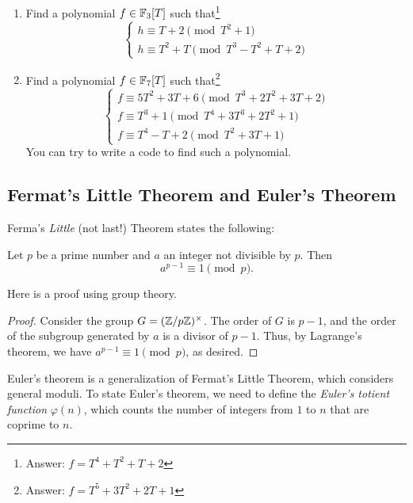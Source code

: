 \begin{exercise}
    \begin{enumerate}
        \item Find a polynomial $f \in \mathbb{F}_3[T]$ such that\footnote{Answer: $f = T^4 + T^2 + T + 2$}
        \[
        \begin{cases}
            h \equiv T + 2 \pmod{T^2 + 1} \\
            h \equiv T^2 + T \pmod{T^3 - T^2 +  T + 2}
        \end{cases} 
        \]
        \item Find a polynomial $f \in \mathbb{F}_{7}[T]$ such that\footnote{Answer: $f = T^5 + 3T^2 + 2T + 1$}
        \[
        \begin{cases}
            f \equiv 5T^2 + 3T + 6 \pmod{T^3 + 2T^2 + 3T + 2} \\
            f \equiv T^3 + 1 \pmod{T^4 + 3T^3 + 2T^2 + 1} \\
            f \equiv T^4 - T + 2 \pmod{T^2 + 3T + 1}
        \end{cases} 
        \]
        You can try to write a code to find such a polynomial.
    \end{enumerate}
\end{exercise}

\subsection{Fermat's Little Theorem and Euler's Theorem}
\label{subsec:basicnt_flittlet}

Ferma's \emph{Little} (not last!) Theorem states the following:
\begin{theorem}
    \label{thm:fermat_little}
    Let $p$ be a prime number and $a$ an integer not divisible by $p$.
    Then
    \[
        a^{p - 1} \equiv 1 \pmod{p}.
    \]
\end{theorem}

Here is a proof using group theory.

\begin{proof}
    Consider the group $G = (\mathbb{Z} / p\mathbb{Z})^\times$.
    The order of $G$ is $p - 1$, and the order of the subgroup generated by $a$ is a divisor of $p - 1$.
    Thus, by Lagrange's theorem, we have $a^{p - 1} \equiv 1 \pmod{p}$, as desired.
\end{proof}

Euler's theorem is a generalization of Fermat's Little Theorem, which considers general moduli.
To state Euler's theorem, we need to define the \emph{Euler's totient function} $\varphi(n)$, which counts the number of integers from $1$ to $n$ that are coprime to $n$.

